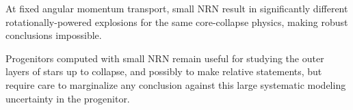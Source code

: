 \documentclass[twocolumn]{aastex63}
\begin{document}
At fixed angular momentum transport, small NRN result in significantly
different rotationally-powered explosions for the same core-collapse
physics, making robust conclusions impossible.

Progenitors computed with small NRN remain useful for studying the
outer layers of stars up to collapse, and possibly to make relative
statements, but require care to marginalize any conclusion against
this large systematic modeling uncertainty in the progenitor.




\end{document}

